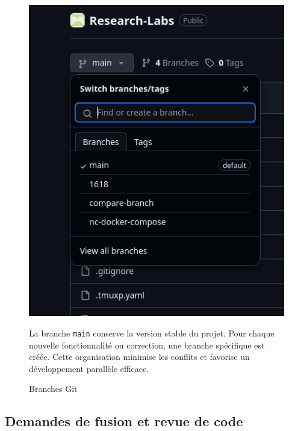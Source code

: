 \documentclass[12pt]{rapportPfe}
\begin{document}
\begin{figure}[H]
    \centering
    \begin{minipage}[t]{0.3\textwidth}
        \vspace{0pt} 
        \includegraphics[width=\textwidth]{diagrams/ss_04.png}
        \caption{Branches Git}
        \label{fig:diagram5}
    \end{minipage}
    \hfill
    \begin{minipage}[t]{0.65\textwidth}
        \vspace{80pt} 
        \noindent La branche \texttt{main} conserve la version stable du projet. Pour chaque nouvelle fonctionnalité ou correction, une branche spécifique est créée. Cette organisation minimise les conflits et favorise un développement parallèle efficace.
    \end{minipage}
\end{figure}



\subsection{Demandes de fusion et revue de code}
\end{document}
